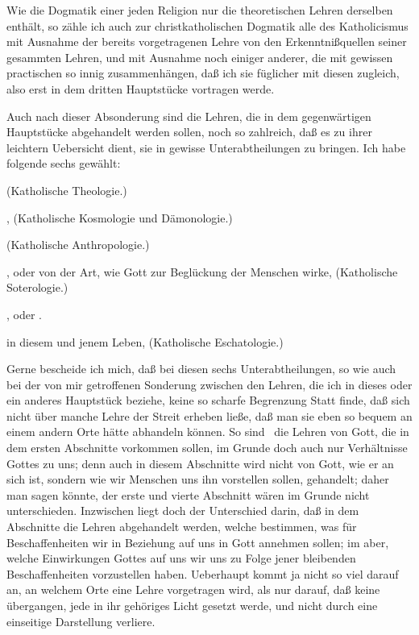 \begin{aufza}
\item Wie die Dogmatik einer jeden Religion nur die theoretischen Lehren derselben enthält, so zähle ich auch zur christkatholischen Dogmatik alle  des Katholicismus mit Ausnahme der bereits vorgetragenen Lehre von den Erkenntnißquellen seiner gesammten Lehren, und mit Ausnahme noch einiger anderer, die mit gewissen practischen so innig zusammenhängen, daß ich sie füglicher mit diesen zugleich, also erst in dem dritten Hauptstücke vortragen werde.
\item Auch nach dieser Absonderung sind die Lehren, die in dem gegenwärtigen Hauptstücke abgehandelt werden sollen, noch so zahlreich, daß es zu ihrer leichtern Uebersicht dient, sie in gewisse Unterabtheilungen zu bringen. Ich habe folgende sechs gewählt:
\begin{aufzb}
\item {} (Katholische Theologie.)
\item {}, (Katholische Kosmologie und Dämonologie.)
\item {} (Katholische Anthropologie.)
\item {}, oder von der Art, wie Gott zur Beglückung der Menschen wirke, (Katholische Soterologie.)
\item {}, oder .~
\item {} in diesem und jenem Leben, (Katholische Eschatologie.)
\end{aufzb}
\item Gerne bescheide ich mich, daß bei diesen sechs Unterabtheilungen, so wie auch bei der von mir getroffenen Sonderung zwischen den Lehren, die ich in dieses oder ein anderes Hauptstück beziehe, keine so scharfe Begrenzung Statt finde, daß sich nicht über manche Lehre der Streit erheben ließe, daß man sie eben so bequem an einem andern Orte hätte abhandeln können. So sind \zB\ die Lehren von Gott, die in dem ersten Abschnitte vorkommen sollen, im Grunde doch auch nur Verhältnisse Gottes zu uns; denn auch in diesem Abschnitte wird nicht von Gott, wie er an sich ist, sondern wie wir Menschen uns ihn vorstellen sollen, gehandelt; daher man sagen könnte, der erste und vierte Abschnitt wären im Grunde nicht unterschieden. Inzwischen liegt doch der Unterschied darin, daß in dem  Abschnitte die Lehren abgehandelt werden, welche bestimmen, was für  Beschaffenheiten wir in Beziehung auf uns in Gott annehmen sollen; im  aber, welche  Einwirkungen Gottes auf uns wir uns zu Folge jener bleibenden Beschaffenheiten vorzustellen haben. Ueberhaupt kommt ja nicht so viel darauf an, an welchem Orte eine Lehre vorgetragen wird, als nur darauf, daß keine übergangen, jede in ihr gehöriges Licht gesetzt werde, und nicht durch eine einseitige Darstellung verliere.

\end{aufza}
